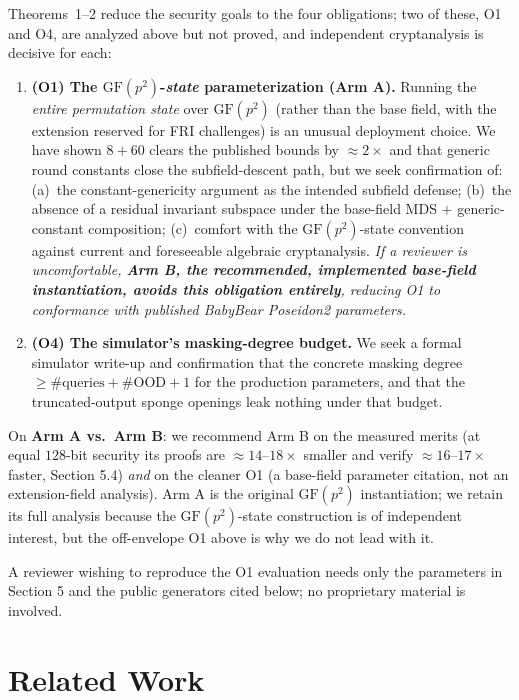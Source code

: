\documentclass[11pt]{article}
\newcommand{\GF}[1]{\mathrm{GF}(#1)}
\theoremstyle{plain}
\theoremstyle{definition}
\begin{document}
Theorems~1--2 reduce the security goals to the four obligations; two of these, O1 and O4, are analyzed
above but not proved, and independent cryptanalysis is decisive for each:
\begin{enumerate}[leftmargin=*]
\item \textbf{(O1) The $\GF{p^2}$-\emph{state} parameterization (Arm A).} Running the \emph{entire
  permutation state} over $\GF{p^2}$ (rather than the base field, with the extension reserved for FRI
  challenges) is an unusual deployment choice. We have shown $8 + 60$ clears the published bounds by
  $\approx 2\times$ and that generic round constants close the subfield-descent path, but we seek
  confirmation of: (a)~the constant-genericity argument as the intended subfield defense; (b)~the
  absence of a residual invariant subspace under the base-field MDS $+$ generic-constant composition;
  (c)~comfort with the $\GF{p^2}$-state convention against current and foreseeable algebraic
  cryptanalysis. \emph{If a reviewer is uncomfortable, \textbf{Arm B, the recommended, implemented
  base-field instantiation, avoids this obligation entirely}, reducing O1 to conformance with
  published BabyBear Poseidon2 parameters.}
\item \textbf{(O4) The simulator's masking-degree budget.} We seek a formal simulator write-up and
  confirmation that the concrete masking degree $\geq \#\mathrm{queries} + \#\mathrm{OOD} + 1$ for the
  production parameters, and that the truncated-output sponge openings leak nothing under that budget.
\end{enumerate}

On \textbf{Arm A vs.\ Arm B}: we recommend Arm B on the measured merits (at equal $128$-bit security
its proofs are $\approx 14$--$18\times$ smaller and verify $\approx 16$--$17\times$ faster,
Section 5.4) \emph{and} on the cleaner O1 (a base-field parameter citation, not an extension-field
analysis). Arm A is the original $\GF{p^2}$ instantiation; we retain its full analysis because the
$\GF{p^2}$-state construction is of independent interest, but the off-envelope O1 above is why we do
not lead with it.

A reviewer wishing to reproduce the O1 evaluation needs only the parameters in Section 5 and the
public generators cited below; no proprietary material is involved.

\section{Related Work}
\end{document}
